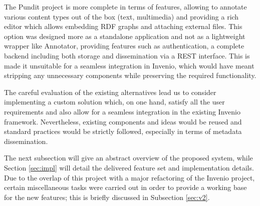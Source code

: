 The Pundit project is more complete in terms of features, allowing to annotate
various content types out of the box (text, multimedia) and providing a rich
editor which allows embedding RDF graphs and attaching external files. This
option was designed more as a standalone application and not as a lightweight
wrapper like Annotator, providing features such as authentication, a complete
backend including both storage and dissemination via a REST interface. This is
made it unsuitable for a seamless integration in Invenio, which would have
meant stripping any unnecessary components while preserving the required
functionality.

The careful evaluation of the existing alternatives lead us to consider
implementing a custom solution which, on one hand, satisfy all the user
requirements and also allow for a seamless integration in the existing Invenio
framework. Nevertheless, existing components and ideas would be reused and
standard practices would be strictly followed, especially in terms of metadata
dissemination.

The next subsection will give an abstract overview of the proposed system,
while Section \ref{sec:impl} will detail the delivered feature set and
implementation details. Due to the overlap of this project with a major
refactoring of the Invenio project, certain miscellaneous tasks were carried
out in order to provide a working base for the new features; this is briefly
discussed in Subsection \ref{sec:v2}.
